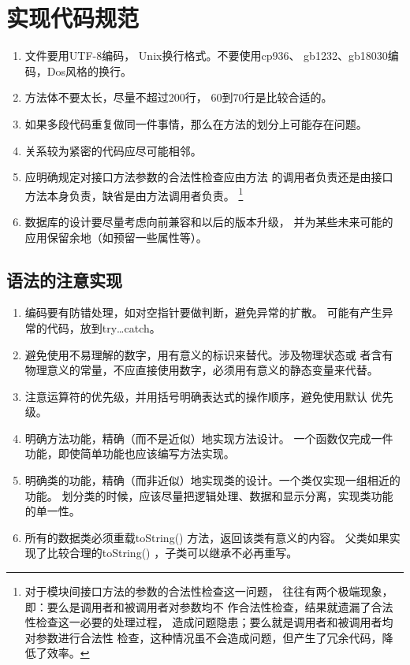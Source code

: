 \documentclass[a4paper,12pt]{article}
\begin{document}
\section{实现代码规范}
\begin{enumerate} 
    \item 文件要用UTF-8编码， Unix换行格式。不要使用cp936、
        gb1232、gb18030编码，Dos风格的换行。
    \item 方法体不要太长，尽量不超过200行， 60到70行是比较合适的。
    \item 如果多段代码重复做同一件事情，那么在方法的划分上可能存在问题。
    \item 关系较为紧密的代码应尽可能相邻。
    \item 应明确规定对接口方法参数的合法性检查应由方法
        的调用者负责还是由接口方法本身负责，缺省是由方法调用者负责。
        \footnote {对于模块间接口方法的参数的合法性检查这一问题，
        往往有两个极端现象，即：要么是调用者和被调用者对参数均不
        作合法性检查，结果就遗漏了合法性检查这一必要的处理过程，
        造成问题隐患；要么就是调用者和被调用者均对参数进行合法性
        检查，这种情况虽不会造成问题，但产生了冗余代码，降低了效率。}
    \item 数据库的设计要尽量考虑向前兼容和以后的版本升级，
        并为某些未来可能的应用保留余地（如预留一些属性等）。
\end{enumerate}

\subsection{语法的注意实现}
\begin{enumerate} 
    \item 编码要有防错处理，如对空指针要做判断，避免异常的扩散。
        可能有产生异常的代码，放到try\ldots catch。
    \item 避免使用不易理解的数字，用有意义的标识来替代。涉及物理状态或
        者含有物理意义的常量，不应直接使用数字，必须用有意义的静态变量来代替。
    \item 注意运算符的优先级，并用括号明确表达式的操作顺序，避免使用默认
        优先级。
    \item 明确方法功能，精确（而不是近似）地实现方法设计。
        一个函数仅完成一件功能，即使简单功能也应该编写方法实现。
    \item 明确类的功能，精确（而非近似）地实现类的设计。一个类仅实现一组相近的功能。
        划分类的时候，应该尽量把逻辑处理、数据和显示分离，实现类功能的单一性。
    \item 所有的数据类必须重载toString() 方法，返回该类有意义的内容。
        父类如果实现了比较合理的toString() ，子类可以继承不必再重写。
\end{enumerate}
\end{document}
